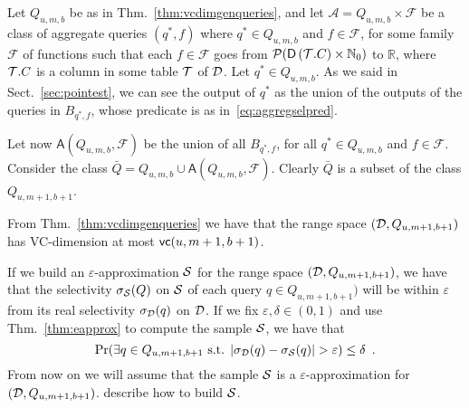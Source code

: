 Let $Q_{u,m,b}$ be as in Thm.~\ref{thm:vcdimgenqueries}, and let
$\mathcal{A}=Q_{u,m,b}\times\mathcal{F}$  be a class of aggregate queries $(q^*,f)$
where $q^*\in Q_{u,m,b}$ and $f\in\mathcal{F}$, for some family $\mathcal{F}$ of
functions such that each $f\in\mathcal{F}$ goes from
$\mathcal{P}(\mathsf{D}\left({\cal T}.C\right)\times\mathbb{N}_0)$ to $\mathbb{R}$, where ${\cal T}.C$
is a column in some table ${\cal T}$ of ${\cal D}$. Let $q^*\in Q_{u,m,b}$. As we said in
Sect.~\ref{sec:pointest}, we can see the output of $q^*$ as the union of the
outputs of the queries in $B_{q^*,f}$, whose predicate is as
in~\eqref{eq:aggregselpred}. 

Let now $\mathsf{A}(Q_{u,m,b},\mathcal{F})$ be the union of all $B_{q^*,f}$, for
all $q^*\in Q_{u,m,b}$ and $f\in\mathcal{F}$. Consider the class
$\bar{Q}=Q_{u,m,b}\cup \mathsf{A}(Q_{u,m,b},\mathcal{F})$. Clearly $\bar{Q}$ is
a subset of the class $Q_{u,m+1,b+1}$. 

\begin{fact}
From Thm.~\ref{thm:vcdimgenqueries} we have that the range space
$({\cal D},Q_{u,m+1,b+1})$ has VC-dimension at most $\mathsf{vc}(u,m+1,b+1)$. 
\end{fact}

If we build an $\varepsilon$-approximation ${\cal S}$ for
the range space $({\cal D},Q_{u,m+1,b+1})$, we have that the selectivity
$\sigma_{\cal S}(Q)$ on ${\cal S}$ of each query $q\in Q_{u,m+1,b+1})$  will be
within $\varepsilon$ from its real selectivity $\sigma_{\cal D}(q)$ on ${\cal D}$.
If we fix $\varepsilon,\delta\in(0,1)$ and use Thm.~\ref{thm:eapprox} to
compute the sample ${\cal S}$, we have that 
\[
\Pr(\exists q\in Q_{u,m+1,b+1} \text{ s.t. }
|\selectivity_\Db(q)-\selectivity_\Sam(q)|>\varepsilon)\le\delta\enspace.
\]
From now on we will assume that the sample ${\cal S}$ is a
$\varepsilon$-approximation for $({\cal D},Q_{u,m+1,b+1})$. \citet{RiondatoACZU11}
describe how to build ${\cal S}$.

